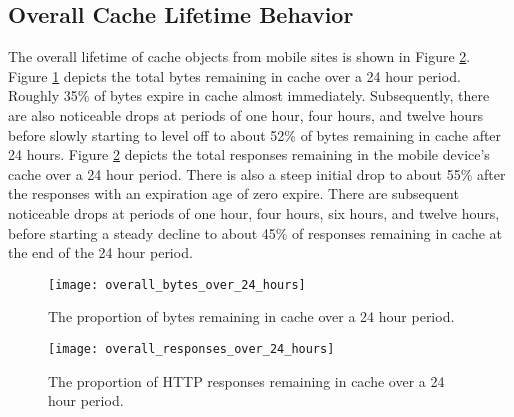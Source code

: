 \subsection*{Overall Cache Lifetime Behavior}

The overall lifetime of cache objects from mobile sites is shown in Figure \ref{fig:overall_responses_over_24_hours}. Figure \ref{fig:overall_bytes_over_24_hours} depicts the total bytes remaining in cache over a 24 hour period. Roughly 35\% of bytes expire in cache almost immediately. Subsequently, there are also noticeable drops at periods of one hour, four hours, and twelve hours before slowly starting to level off to about 52\% of bytes remaining in cache after 24 hours. Figure \ref{fig:overall_responses_over_24_hours} depicts the total responses remaining in the mobile device’s cache over a 24 hour period. There is also a steep initial drop to about 55\% after the responses with an expiration age of zero expire. There are subsequent noticeable drops at periods of one hour, four hours, six hours, and twelve hours, before starting a steady decline to about 45\% of responses remaining in cache at the end of the 24 hour period.

\begin{figure}[]
	\centering
	\texttt{[image: overall\_bytes\_over\_24\_hours]}
	\caption{The proportion of bytes remaining in cache over a 24 hour period.}
	\label{fig:overall_bytes_over_24_hours}
\end{figure}

\begin{figure}[]
	\centering
	\texttt{[image: overall\_responses\_over\_24\_hours]}
	\caption{The proportion of HTTP responses remaining in cache over a 24 hour period.}
	\label{fig:overall_responses_over_24_hours}
\end{figure}

